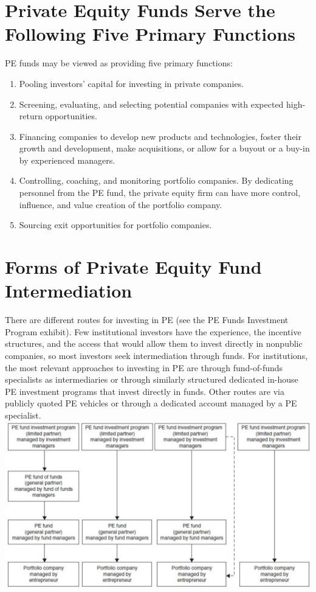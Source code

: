 \documentclass[11pt]{article}
\begin{document}
\section*{Private Equity Funds Serve the Following Five Primary Functions}
PE funds may be viewed as providing five primary functions:

\begin{enumerate}
  \item Pooling investors' capital for investing in private companies.

  \item Screening, evaluating, and selecting potential companies with expected high-return opportunities.

  \item Financing companies to develop new products and technologies, foster their growth and development, make acquisitions, or allow for a buyout or a buy-in by experienced managers.

  \item Controlling, coaching, and monitoring portfolio companies. By dedicating personnel from the PE fund, the private equity firm can have more control, influence, and value creation of the portfolio company.

  \item Sourcing exit opportunities for portfolio companies.

\end{enumerate}

\section*{Forms of Private Equity Fund Intermediation}
There are different routes for investing in PE (see the PE Funds Investment Program exhibit). Few institutional investors have the experience, the incentive structures, and the access that would allow them to invest directly in nonpublic companies, so most investors seek intermediation through funds. For institutions, the most relevant approaches to investing in PE are through fund-of-funds specialists as intermediaries or through similarly structured dedicated in-house PE investment programs that invest directly in funds. Other routes are via publicly quoted PE vehicles or through a dedicated account managed by a PE specialist.\\
\includegraphics[max width=\textwidth, center]{2024_04_10_9afab3e78f4ed9e425bag-2}
\end{document}
